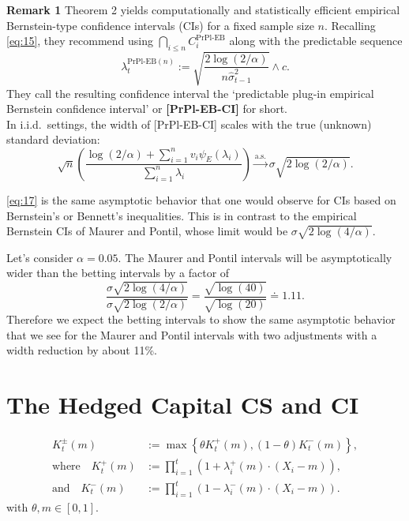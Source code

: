 \documentclass{article}
\newcommand{\art}[1]{\begingroup\color{blue}#1\endgroup}
\renewcommand{\leq}{\leqslant}
\begin{document}
\noindent \textbf{Remark 1} Theorem 2 yields computationally and statistically efficient empirical Bernstein-type confidence intervals (CIs) for a fixed sample size \( n \). Recalling \eqref{eq:15}, they recommend using \( \bigcap_{i \leq n} C_i^{\text{PrPl-EB}} \) along with the predictable sequence  
\begin{equation} \label{eq:16}
    \lambda_t^{\text{PrPl-EB}(n)} := 
    \sqrt{\frac{2 \log(2/\alpha)}{n \hat{\sigma}^2_{t-1}}} \wedge c.
\end{equation}
They call the resulting confidence interval the ‘predictable plug-in empirical Bernstein confidence interval’ or \textbf{[PrPl-EB-CI]} for short. \\

\noindent In i.i.d.\ settings, the width of [PrPl-EB-CI] scales with the true (unknown) standard deviation:  
\begin{equation} \label{eq:17}
    \sqrt{n} \left( \frac{{\log (2/\alpha) + \sum_{i=1}^{n} v_i \psi_E(\lambda_i)}}{\sum_{i=1}^{n} \lambda_i} \right)
    \xrightarrow{\text{a.s.}} 
    \sigma \sqrt{2 \log (2/\alpha)}.
\end{equation}

\noindent \eqref{eq:17} is the same asymptotic behavior that one would observe for CIs based on
Bernstein’s or Bennett’s inequalities. This is in contrast to the empirical Bernstein CIs of Maurer and
Pontil, whose limit would be \( \sigma \sqrt{2 \log (4/\alpha)}\).

\art{Let's consider $\alpha=0.05$. The Maurer and Pontil intervals will be asymptotically wider than the betting intervals by a factor of
$$
\frac{\sigma\sqrt{2\log(4/\alpha)}}{\sigma\sqrt{2\log(2/\alpha)}}
=\frac{\sqrt{\log(40)}}{\sqrt{\log(20)}} \doteq 1.11.
$$
Therefore we expect the betting intervals to show the same asymptotic behavior that we see for the Maurer and Pontil intervals with two adjustments with a width reduction by about 11\%.}



\section{The Hedged Capital CS and CI}
\setcounter{equation}{23}
\begin{equation} \label{eq:24}
\begin{aligned}
    K^\pm_t (m) &:= \max \left\{ \theta K^+_t (m), (1 - \theta) K^-_t (m) \right\}, \\
    \text{where} \quad K^+_t (m) &:= \prod_{i=1}^{t} \left( 1 + \lambda^+_i (m) \cdot (X_i - m) \right), \\
    \text{and} \quad K^-_t (m) &:= \prod_{i=1}^{t} \left( 1 - \lambda^-_i (m) \cdot (X_i - m) \right).
\end{aligned}
\end{equation}
with \( \theta, m \in [0,1] \).
\end{document}
